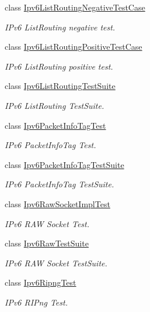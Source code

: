 \begin{DoxyCompactItemize}
class \hyperlink{classIpv6ListRoutingNegativeTestCase}{Ipv6\+List\+Routing\+Negative\+Test\+Case}
\begin{DoxyCompactList}\small\item\em I\+Pv6 List\+Routing negative test. \end{DoxyCompactList}\item 
class \hyperlink{classIpv6ListRoutingPositiveTestCase}{Ipv6\+List\+Routing\+Positive\+Test\+Case}
\begin{DoxyCompactList}\small\item\em I\+Pv6 List\+Routing positive test. \end{DoxyCompactList}\item 
class \hyperlink{classIpv6ListRoutingTestSuite}{Ipv6\+List\+Routing\+Test\+Suite}
\begin{DoxyCompactList}\small\item\em I\+Pv6 List\+Routing Test\+Suite. \end{DoxyCompactList}\item 
class \hyperlink{classIpv6PacketInfoTagTest}{Ipv6\+Packet\+Info\+Tag\+Test}
\begin{DoxyCompactList}\small\item\em I\+Pv6 Packet\+Info\+Tag Test. \end{DoxyCompactList}\item 
class \hyperlink{classIpv6PacketInfoTagTestSuite}{Ipv6\+Packet\+Info\+Tag\+Test\+Suite}
\begin{DoxyCompactList}\small\item\em I\+Pv6 Packet\+Info\+Tag Test\+Suite. \end{DoxyCompactList}\item 
class \hyperlink{classIpv6RawSocketImplTest}{Ipv6\+Raw\+Socket\+Impl\+Test}
\begin{DoxyCompactList}\small\item\em I\+Pv6 R\+AW Socket Test. \end{DoxyCompactList}\item 
class \hyperlink{classIpv6RawTestSuite}{Ipv6\+Raw\+Test\+Suite}
\begin{DoxyCompactList}\small\item\em I\+Pv6 R\+AW Socket Test\+Suite. \end{DoxyCompactList}\item 
class \hyperlink{classIpv6RipngTest}{Ipv6\+Ripng\+Test}
\begin{DoxyCompactList}\small\item\em I\+Pv6 R\+I\+Png Test. \end{DoxyCompactList}\item 

\end{DoxyCompactItemize}

